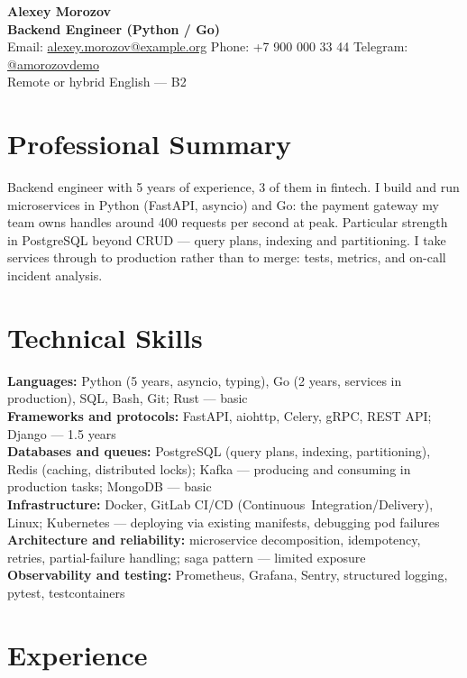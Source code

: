 \documentclass[a4paper,10pt]{article}
\makeatletter
\newcommand{\CICD}{\mbox{CI/CD}}
\newcommand{\CVName}{Alexey Morozov}
\newcommand{\CVTitle}{Backend Engineer (Python / Go)}
\newcommand{\CVEmail}{alexey.morozov@example.org}
\newcommand{\CVPhone}{+7 900 000 33 44}
\newcommand{\CVTelegram}{amorozovdemo}
\makeatother
\begin{document}
{\LARGE \textbf{\CVName}}\\
\textbf{\CVTitle}\\
Email: \href{mailto:\CVEmail}{\CVEmail} \quad
Phone: \CVPhone \quad
Telegram: \href{https://t.me/\CVTelegram}{@\CVTelegram}\\
Remote or hybrid \quad English --- B2

\section*{Professional Summary}

Backend engineer with 5 years of experience, 3 of them in fintech. I build and run
microservices in Python (FastAPI, asyncio) and Go: the payment gateway my team owns
handles around 400 requests per second at peak. Particular strength in PostgreSQL
beyond CRUD --- query plans, indexing and partitioning. I take services through to
production rather than to merge: tests, metrics, and on-call incident analysis.

\section*{Technical Skills}

\textbf{Languages:} Python (5 years, asyncio, typing), Go (2 years, services in
production), SQL, Bash, Git; Rust --- basic\\
\textbf{Frameworks and protocols:} FastAPI, aiohttp, Celery, gRPC, REST API;
Django --- 1.5 years\\
\textbf{Databases and queues:} PostgreSQL (query plans, indexing, partitioning),
Redis (caching, distributed locks); Kafka --- producing and consuming in production
tasks; MongoDB --- basic\\
\textbf{Infrastructure:} Docker, GitLab \CICD{} (\mbox{Continuous Integration/Delivery}),
Linux; Kubernetes --- deploying via existing manifests, debugging pod failures\\
\textbf{Architecture and reliability:} microservice decomposition, idempotency,
retries, partial-failure handling; saga pattern --- limited exposure\\
\textbf{Observability and testing:} Prometheus, Grafana, Sentry, structured logging,
pytest, testcontainers

\section*{Experience}
\end{document}
